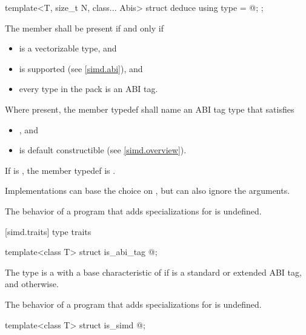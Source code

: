 \begin{itemdecl}
template<T, size_t N, class... Abis> struct deduce { using type = @\seebelow@; };
\end{itemdecl}

\begin{itemdescr}
\pnum
The member  shall be present if and only if
\begin{itemize}
  \item {} is a vectorizable type, and
  \item {} is supported (see \ref{simd.abi}), and
  \item every type in the  pack is an ABI tag.
\end{itemize}

\pnum
Where present, the member typedef  shall name an ABI tag type that satisfies
\begin{itemize}
  \item {}, and
  \item {} is default constructible (see \ref{simd.overview}).
\end{itemize}
If  is , the member typedef  is .
\begin{note}
  Implementations can base the choice on , but can also ignore the  arguments.
\end{note}

\pnum
The behavior of a program that adds specializations for  is undefined.
\end{itemdescr}

[simd.traits]{ type traits}

\begin{itemdecl}
template<class T> struct is_abi_tag { @\seebelow@ };
\end{itemdecl}

\begin{itemdescr}
\pnum
The type  is a  with a base characteristic of  if  is a standard or extended ABI tag, and  otherwise.

\pnum
The behavior of a program that adds specializations for  is undefined.
\end{itemdescr}

\begin{itemdecl}
template<class T> struct is_simd { @\seebelow@ };
\end{itemdecl}

